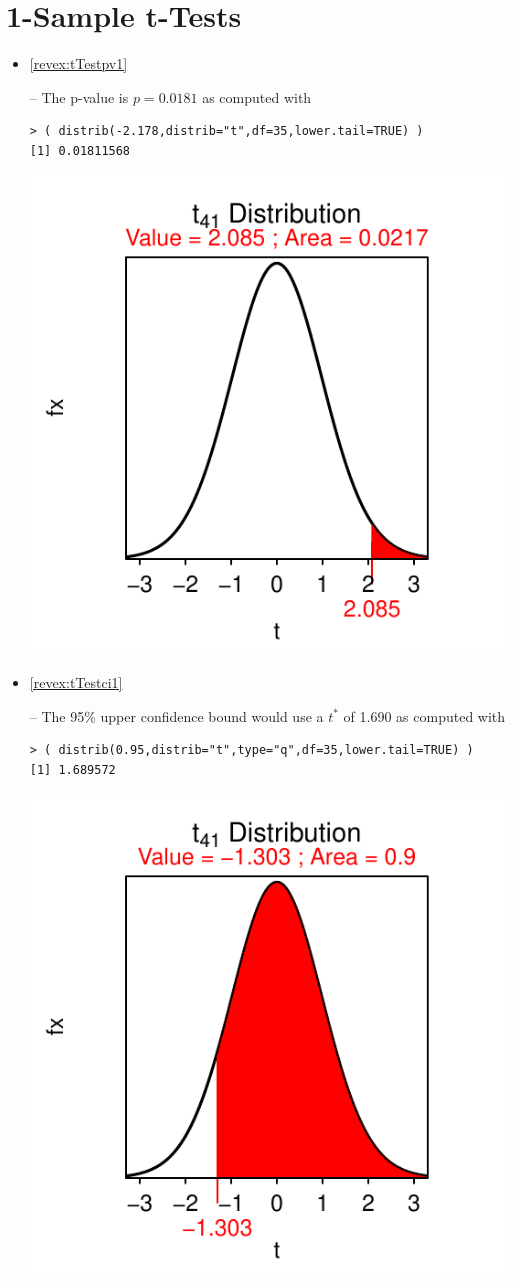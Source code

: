\documentclass[10pt,openany]{book}\usepackage[]{graphicx}\usepackage[]{color}
\makeatletter
\newenvironment{kframe}{%
 \def\at@end@of@kframe{}%
 \ifinner\ifhmode%
  \def\at@end@of@kframe{\end{minipage}}%
  \begin{minipage}{\columnwidth}%
 \fi\fi%
 \def\FrameCommand##1{\hskip\@totalleftmargin \hskip-\fboxsep
 \colorbox{shadecolor}{##1}\hskip-\fboxsep
     \hskip-\linewidth \hskip-\@totalleftmargin \hskip\columnwidth}%
 \MakeFramed {\advance\hsize-\width
   \@totalleftmargin\z@ \linewidth\hsize
   \@setminipage}}%
 {\par\unskip\endMakeFramed%
 \at@end@of@kframe}
\newenvironment{knitrout}{}{} %
\makeatother
\begin{document}
\section*{1-Sample t-Tests}
\begin{itemize}
  \item \hypertarget{ans:tTestpv1}{\ref{revex:tTestpv1}} -- The p-value is $p=0.0181$ as computed with
\begin{knitrout}
\color{fgcolor}\begin{kframe}
\begin{verbatim}
> ( distrib(-2.178,distrib="t",df=35,lower.tail=TRUE) )
[1] 0.01811568
\end{verbatim}
\end{kframe}

{\centering \includegraphics[width=.4\linewidth]{Figs/unnamed-chunk-362-1} 

}



\end{knitrout}
  \item \hypertarget{ans:tTestci1}{\ref{revex:tTestci1}} -- The 95\% upper confidence bound would use a $t^{*}$ of 1.690 as computed with
\begin{knitrout}
\color{fgcolor}\begin{kframe}
\begin{verbatim}
> ( distrib(0.95,distrib="t",type="q",df=35,lower.tail=TRUE) )
[1] 1.689572
\end{verbatim}
\end{kframe}

{\centering \includegraphics[width=.4\linewidth]{Figs/unnamed-chunk-363-1} 

}
\end{knitrout}
\end{itemize}
\end{document}
